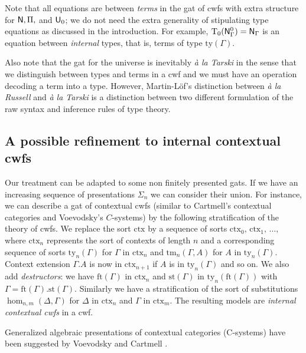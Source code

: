 \documentclass{lmcs}
\newcommand{\FYI}[1]{{\color{red}#1}}
\newcommand{\Ta}{\mathrm{T}}
\newcommand{\ctx}{\mathrm{ctx}}
\newcommand{\ty}{\mathrm{ty}}
\newcommand{\tm}{\mathrm{tm}}
\begin{document}
\begin{remark}\label{remark:typeequations}
Note that all equations are between {\em terms} in the gat of cwfs with extra structure for $\mathsf{N}, \Pi,$ and $\mathsf{U}_0$; we do not need the extra generality of stipulating type equations as discussed in the introduction. For example, $\Ta_0(\N^0_\Gamma) = \N_\Gamma$ is an equation between {\em internal} types, that is, terms of type $\ty(\Gamma)$.
\end{remark}

\begin{remark}
Also note that the gat for the universe is inevitably {\em \`a la Tarski} in the sense that we distinguish between types and terms in a cwf and we must have an operation decoding a term into a type. However, Martin-Löf's distinction between {\em \`a la Russell} and {\em \`a la Tarski} \cite{martinlof:padova} is a distinction between two different formulation of the raw syntax and inference rules of type theory.
\end{remark}

\subsection{A possible refinement to internal contextual cwfs}

Our treatment can be adapted to some non finitely presented gats.
If we have an increasing sequence of \FYI{presentations} $\Sigma_n$ we can consider their
union.
For instance, we can describe a gat of contextual cwfs \cite{castellan:lambek} (similar to Cartmell's contextual categories and Voevodsky's $C$-systems) by
the following stratification of the theory of cwfs. We replace the sort $\ctx$
by a sequence of sorts $\ctx_0,\,\ctx_1,\,\dots ,$ where $\ctx_n$ represents the sort
of contexts of length $n$ and a corresponding sequence of sorts
$\ty_n(\Gamma)$ for $\Gamma$ in $\ctx_n$
and $\tm_n(\Gamma,A)$ for $A$ in $\ty_n(\Gamma)$. Context extension $\Gamma.A$ is now in $\ctx_{n+1}$
if $A$ is in $\ty_n(\Gamma)$ and so on.
We also add {\em destructors}: we have
$\mathrm{ft}(\Gamma)$ in $\ctx_n$
and $\mathrm{st}(\Gamma)$ in $\ty_n(\mathrm{ft}(\Gamma))$
with $\Gamma = \mathrm{ft}(\Gamma).\mathrm{st}(\Gamma)$.
Similarly we have a stratification of the sort of substitutions
$\hom_{n,m}(\Delta,\Gamma)$ for $\Delta$ in $\ctx_n$ and $\Gamma$ in $\ctx_m$.
The resulting models are {\em internal contextual cwfs} in a cwf.

\begin{remark}
Generalized algebraic presentations of contextual categories (C-systems) have been suggested by Voevodsky \cite{voevodsky:c-systems} and Cartmell \cite{cartmell:gat-contextual}.
\end{remark}
\end{document}
